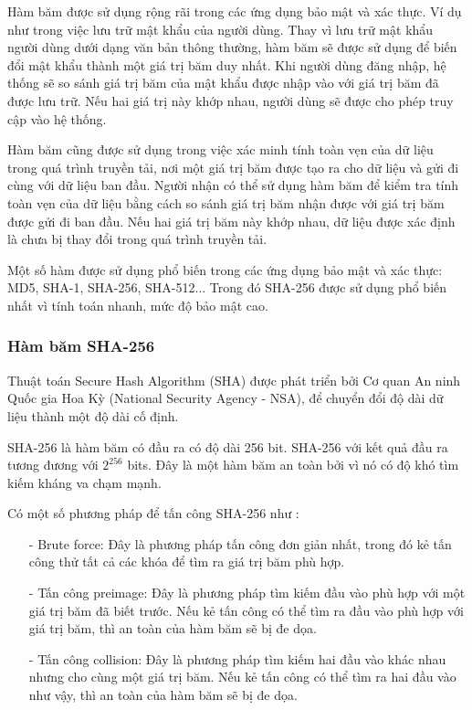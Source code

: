 Hàm băm được sử dụng rộng rãi trong các ứng dụng bảo mật và xác thực. Ví dụ như trong việc lưu trữ
mật khẩu của người dùng. Thay vì lưu trữ mật khẩu người dùng dưới dạng văn bản thông thường, hàm 
băm sẽ được sử dụng để biến đổi mật khẩu thành một giá trị băm duy nhất. Khi người dùng đăng nhập, 
hệ thống sẽ so sánh giá trị băm của mật khẩu được nhập vào với giá trị băm đã được lưu trữ. Nếu hai 
giá trị này khớp nhau, người dùng sẽ được cho phép truy cập vào hệ thống.

Hàm băm cũng được sử dụng trong việc xác minh tính toàn vẹn của dữ liệu trong quá trình truyền tải, 
nơi một giá trị băm được tạo ra cho dữ liệu và gửi đi cùng với dữ liệu ban đầu. Người nhận có thể 
sử dụng hàm băm để kiểm tra tính toàn vẹn của dữ liệu bằng cách so sánh giá trị băm nhận được với 
giá trị băm được gửi đi ban đầu. Nếu hai giá trị băm này khớp nhau, dữ liệu được xác định là chưa 
bị thay đổi trong quá trình truyền tải.

Một số hàm được sử dụng phổ biến trong các ứng dụng bảo mật và xác thực: MD5, SHA-1, SHA-256, SHA-512...
Trong đó SHA-256 được sử dụng phổ biến nhất vì tính toán nhanh, mức độ bảo mật cao.
\subsubsection{Hàm băm SHA-256}
Thuật toán Secure Hash Algorithm (SHA) được phát triển bởi Cơ quan An ninh
Quốc gia Hoa Kỳ (National Security Agency - NSA), để chuyển đổi độ dài dữ liệu thành một độ dài cố định.

SHA-256 là hàm băm có đầu ra có độ dài 256 bit. SHA-256 với kết quả đầu ra tương đương với $2^{256}$ bits.
Đây là một hàm băm an toàn bởi vì nó có độ khó tìm kiếm kháng va chạm mạnh. 

Có một số phương pháp để tấn công SHA-256 như :
\begin{itemize}
\item[-] Brute force: Đây là phương pháp tấn công đơn giản nhất, trong đó kẻ tấn công
thử tất cả các khóa để tìm ra giá trị băm phù hợp. 
\item[-] Tấn công preimage: Đây là phương pháp tìm kiếm đầu vào phù hợp với một giá 
trị băm đã biết trước. Nếu kẻ tấn công có thể tìm ra đầu vào phù hợp với giá trị băm, thì an toàn của hàm băm sẽ bị đe dọa.
\item[-] Tấn công collision: Đây là phương pháp tìm kiếm hai đầu vào khác nhau nhưng cho
cùng một giá trị băm. Nếu kẻ tấn công có thể tìm ra hai đầu vào như vậy, thì an toàn của hàm băm sẽ bị đe dọa.
\end{itemize}

